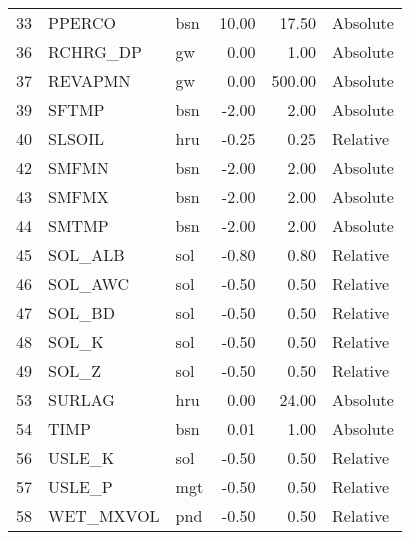 \begin{table}[ht]
\begin{tabular}{rllrrl}
  33 & PPERCO & bsn & 10.00 & 17.50 & Absolute \\ 
  36 & RCHRG\_DP & gw & 0.00 & 1.00 & Absolute \\ 
  37 & REVAPMN & gw & 0.00 & 500.00 & Absolute \\ 
  39 & SFTMP & bsn & -2.00 & 2.00 & Absolute \\ 
  40 & SLSOIL & hru & -0.25 & 0.25 & Relative \\ 
  42 & SMFMN & bsn & -2.00 & 2.00 & Absolute \\ 
  43 & SMFMX & bsn & -2.00 & 2.00 & Absolute \\ 
  44 & SMTMP & bsn & -2.00 & 2.00 & Absolute \\ 
  45 & SOL\_ALB & sol & -0.80 & 0.80 & Relative \\ 
  46 & SOL\_AWC & sol & -0.50 & 0.50 & Relative \\ 
  47 & SOL\_BD & sol & -0.50 & 0.50 & Relative \\ 
  48 & SOL\_K & sol & -0.50 & 0.50 & Relative \\ 
  49 & SOL\_Z & sol & -0.50 & 0.50 & Relative \\ 
  53 & SURLAG & hru & 0.00 & 24.00 & Absolute \\ 
  54 & TIMP & bsn & 0.01 & 1.00 & Absolute \\ 
  56 & USLE\_K & sol & -0.50 & 0.50 & Relative \\ 
  57 & USLE\_P & mgt & -0.50 & 0.50 & Relative \\ 
  58 & WET\_MXVOL & pnd & -0.50 & 0.50 & Relative \\ 
   \hline
\end{tabular}
\end{table}
